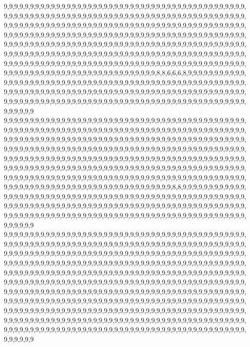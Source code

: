 9,9,9,9,9,9,9,9,9,9,9,9,9,9,9,9,9,9,9,9,9,9,9,9,9,9,9,9,9,9,9,9,9,9,9,9,9,9,9,9,9,9,9,9,9,9,9,9,9,9,9,9,9,9,9,9,9,9,9,9,9,9,9,9,9,9,9,9,9,9,9,9,9,9,9,9,9,9,9,9,9,9,9,9,9,9,9,9,9,9,9,9,9,9,9,9,9,9,9,9,9,9,9,9,9,9,9,9,9,9,9,9,9,9,9,9,9,9,9,9,9,9,9,9,9,9,9,9,9,9,9,9,9,9,9,9,9,9,9,9,9,9,9,9,9,9,9,9,9,9,9,9,9,9,9,9,9,9,9,9,9,9,9,9,9,9,9,9,9,9,9,9,9,9,9,9,9,9,9,9,9,9,9,9,9,9,9,9,9,9,9,9,9,9,9,9,9,9,9,9,9,9,9,9,9,9,9,9,9,9,9,9,9,9,9,9,9,9,9,9,9,9,9,9,9,9,9,9,9,9,9,9,9,9,9,9,9,9,9,9,9,9,9,9,9,9,9,9,9,9,9,9,9,9,9,9,9,9,9,9,9,9,9,9,9,9,9,9,9,9,9,9,9,9,9,9,9,9,9,9,9,9,9,9,9,9,9,9,9,9,9,9,9,9,9,9,9,9,9,9,9,9,9,9,9,9,9,9,9,9,9,9,9,9,9,9,9,9,9,9,9,9,9,9,9,9,9,9,9,9,9,9,9,9,9,9,9,9,9,9,9,9,9,9,9,9,9,9,9,9,9,8,8,6,6,6,8,9,9,9,9,9,9,9,9,9,9,9,9,9,9,9,9,9,9,9,9,9,9,9,9,9,9,9,9,9,9,9,9,9,9,9,9,9,9,9,9,9,9,9,9,9,9,9,9,9,9,9,9,9,9,9,9,9,9,9,9,9,9,9,9,9,9,9,9,9,9,9,9,9,9,9,9,9,9,9,9,9,9,9,9,9,9,9,9,9,9,9,9,9,9,9,9,9,9,9,9,9,9,9,9,9,9,9,9,9,9,9,9,9,9,9,9,9,9,9,9,9,9,9,9,9,9,9,9,9,9,9,9,9,9,9,9,9,9,9,9,9,9,9,9,9,9,9,9,9,9,9,9,9,9,9
9,9,9,9,9,9,9,9,9,9,9,9,9,9,9,9,9,9,9,9,9,9,9,9,9,9,9,9,9,9,9,9,9,9,9,9,9,9,9,9,9,9,9,9,9,9,9,9,9,9,9,9,9,9,9,9,9,9,9,9,9,9,9,9,9,9,9,9,9,9,9,9,9,9,9,9,9,9,9,9,9,9,9,9,9,9,9,9,9,9,9,9,9,9,9,9,9,9,9,9,9,9,9,9,9,9,9,9,9,9,9,9,9,9,9,9,9,9,9,9,9,9,9,9,9,9,9,9,9,9,9,9,9,9,9,9,9,9,9,9,9,9,9,9,9,9,9,9,9,9,9,9,9,9,9,9,9,9,9,9,9,9,9,9,9,9,9,9,9,9,9,9,9,9,9,9,9,9,9,9,9,9,9,9,9,9,9,9,9,9,9,9,9,9,9,9,9,9,9,9,9,9,9,9,9,9,9,9,9,9,9,9,9,9,9,9,9,9,9,9,9,9,9,9,9,9,9,9,9,9,9,9,9,9,9,9,9,9,9,9,9,9,9,9,9,9,9,9,9,9,9,9,9,9,9,9,9,9,9,9,9,9,9,9,9,9,9,9,9,9,9,9,9,9,9,9,9,9,9,9,9,9,9,9,9,9,9,9,9,9,9,9,9,9,9,9,9,9,9,9,9,9,9,9,9,9,9,9,9,9,9,9,9,9,9,9,9,9,9,9,9,9,9,9,9,9,9,9,9,9,9,9,9,9,9,9,9,9,9,9,9,9,9,9,9,9,9,9,9,9,9,9,9,9,8,8,9,9,9,9,9,9,9,9,9,9,9,9,9,9,9,9,9,9,9,9,9,9,9,9,9,9,9,9,9,9,9,9,9,9,9,9,9,9,9,9,9,9,9,9,9,9,9,9,9,9,9,9,9,9,9,9,9,9,9,9,9,9,9,9,9,9,9,9,9,9,9,9,9,9,9,9,9,9,9,9,9,9,9,9,9,9,9,9,9,9,9,9,9,9,9,9,9,9,9,9,9,9,9,9,9,9,9,9,9,9,9,9,9,9,9,9,9,9,9,9,9,9,9,9,9,9,9,9,9,9,9,9,9,9,9,9,9,9,9,9,9,9,9,9,9,9,9,9,9,9,9,9,9,9,9,9
9,9,9,9,9,9,9,9,9,9,9,9,9,9,9,9,9,9,9,9,9,9,9,9,9,9,9,9,9,9,9,9,9,9,9,9,9,9,9,9,9,9,9,9,9,9,9,9,9,9,9,9,9,9,9,9,9,9,9,9,9,9,9,9,9,9,9,9,9,9,9,9,9,9,9,9,9,9,9,9,9,9,9,9,9,9,9,9,9,9,9,9,9,9,9,9,9,9,9,9,9,9,9,9,9,9,9,9,9,9,9,9,9,9,9,9,9,9,9,9,9,9,9,9,9,9,9,9,9,9,9,9,9,9,9,9,9,9,9,9,9,9,9,9,9,9,9,9,9,9,9,9,9,9,9,9,9,9,9,9,9,9,9,9,9,9,9,9,9,9,9,9,9,9,9,9,9,9,9,9,9,9,9,9,9,9,9,9,9,9,9,9,9,9,9,9,9,9,9,9,9,9,9,9,9,9,9,9,9,9,9,9,9,9,9,9,9,9,9,9,9,9,9,9,9,9,9,9,9,9,9,9,9,9,9,9,9,9,9,9,9,9,9,9,9,9,9,9,9,9,9,9,9,9,9,9,9,9,9,9,9,9,9,9,9,9,9,9,9,9,9,9,9,9,9,9,9,9,9,9,9,9,9,9,9,9,9,9,9,9,9,9,9,9,9,9,9,9,9,9,9,9,9,9,9,9,9,9,9,9,9,9,9,9,9,9,9,9,9,9,9,9,9,9,9,9,9,9,9,9,9,9,9,9,9,9,9,9,9,9,9,9,9,9,9,9,9,9,9,9,9,9,9,9,9,9,9,9,9,9,9,9,9,9,9,9,9,9,9,9,9,9,9,9,9,9,9,9,9,9,9,9,9,9,9,9,9,9,9,9,9,9,9,9,9,9,9,9,9,9,9,9,9,9,9,9,9,9,9,9,9,9,9,9,9,9,9,9,9,9,9,9,9,9,9,9,9,9,9,9,9,9,9,9,9,9,9,9,9,9,9,9,9,9,9,9,9,9,9,9,9,9,9,9,9,9,9,9,9,9,9,9,9,9,9,9,9,9,9,9,9,9,9,9,9,9,9,9,9,9,9,9,9,9,9,9,9,9,9,9,9,9,9,9,9,9,9,9,9,9,9,9,9,9,9,9,9,9,9,9,9,9
